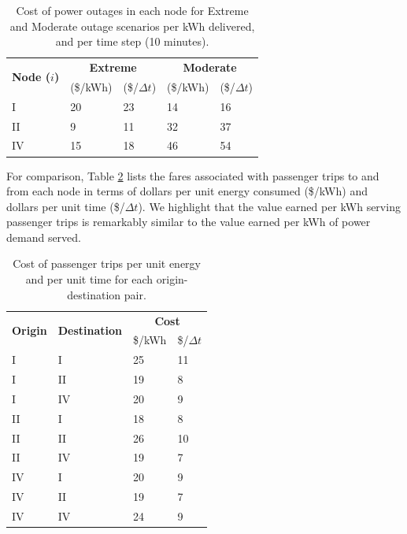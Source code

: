 \documentclass[conference]{IEEEtran}
\begin{document}
\begin{table}[!htbp]
    \renewcommand{\arraystretch}{1}
    \caption{Cost of power outages in each node for Extreme and Moderate outage scenarios per kWh delivered, and per time step (10 minutes).}
    \label{tab:outage_costs}
    \centering
    \def\colmargin{6.75cm}
    \begin{tabular}{lllll}
    \hline
    \multirow{2}{*}{\textbf{Node ($i$)}} & \multicolumn{2}{c}{\textbf{Extreme}} & \multicolumn{2}{c}{\textbf{Moderate}} \\
     & (\$/kWh) & (\$/$\Delta t$) & (\$/kWh) & (\$/$\Delta t$) \\
    \hline
    I  & 20 & 23 & 14 & 16 \\
    II & 9  & 11 & 32 & 37 \\
    IV & 15 & 18 & 46 & 54 \\
    \hline
    \end{tabular}
\end{table}
For comparison, Table \ref{tab:trip_costs} lists the fares associated with passenger trips to and from each node in terms of dollars per unit energy consumed (\$/kWh) and dollars per unit time (\$/$\Delta t$). We highlight that the value earned per kWh serving passenger trips is remarkably similar to the value earned per kWh of power demand served.
\begin{table}[!htbp]
    \renewcommand{\arraystretch}{1}
    \caption{Cost of passenger trips per unit energy and per unit time for each origin-destination pair.}
    \label{tab:trip_costs}
    \centering
    \def\colmargin{6.75cm}
    \begin{tabular}{llll}
    \hline
    \multirow{2}{*}{\textbf{Origin}} & \multirow{2}{*}{\textbf{Destination}} & \multicolumn{2}{c}{\textbf{Cost}} \\
     &  & \$/kWh & \$/$\Delta t$ \\
    \hline
    I  & I  & 25 & 11 \\
    I  & II & 19 & 8 \\
    I  & IV & 20 & 9 \\
    II & I  & 18 & 8 \\
    II & II & 26 & 10 \\
    II & IV & 19 & 7 \\
    IV & I  & 20 & 9 \\
    IV & II & 19 & 7 \\
    IV & IV & 24 & 9 \\
    \hline
    \end{tabular}
\end{table}
\end{document}
